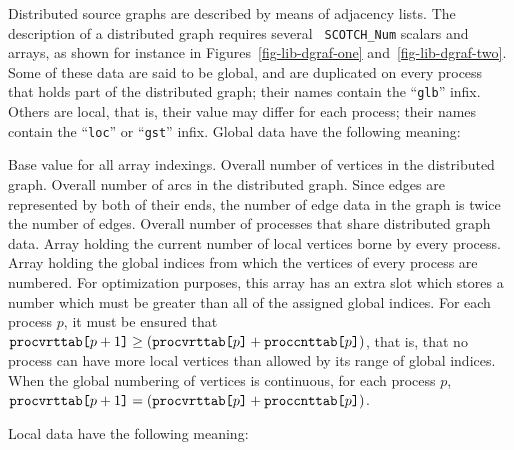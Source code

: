 Distributed source graphs are described by means of adjacency
lists. The description of a distributed graph requires several {\tt
SCOTCH\_Num} scalars and arrays, as shown for instance in
Figures~\ref{fig-lib-dgraf-one} and~\ref{fig-lib-dgraf-two}.
Some of these data are said to be global, and are duplicated on every
process that holds part of the distributed graph; their names contain
the ``{\tt glb}'' infix. Others are local, that is, their value may
differ for each process; their names contain the ``{\tt loc}'' or
``{\tt gst}'' infix. Global data have the following meaning:
\begin{itemize}
\iteme[{\tt baseval}]
Base value for all array indexings.
\iteme[{\tt vertglbnbr}]
Overall number of vertices in the distributed graph.
\iteme[{\tt edgeglbnbr}]
Overall number of arcs in the distributed graph. Since edges are
represented by both of their ends, the number of edge data in
the graph is twice the number of edges.
\iteme[{\tt procglbnbr}]
Overall number of processes that share distributed graph data.
\iteme[{\tt proccnttab}]
Array holding the current number of local vertices borne by every process.
\iteme[{\tt procvrttab}]
Array holding the global indices from which the vertices of every
process are numbered. For optimization purposes, this array has an
extra slot which stores a number which must be greater than all of the
assigned global indices. For each process $p$, it must be ensured that
$\mbox{\tt proc\lbt vrt\lbt tab[}p + 1\mbox{\tt]} \geq
(\mbox{\tt proc\lbt vrt\lbt tab[}p\mbox{\tt]} +
\mbox{\tt proc\lbt cnt\lbt tab[}p\mbox{\tt]})$, that is, that no process
can have more local vertices than allowed by its range of global indices.
When the global numbering of vertices is continuous, for each process $p$,
$\mbox{\tt proc\lbt vrt\lbt tab[}p + 1\mbox{\tt]} =
(\mbox{\tt proc\lbt vrt\lbt tab[}p\mbox{\tt]} +
\mbox{\tt proc\lbt cnt\lbt tab[}p\mbox{\tt]})$.
\end{itemize}
Local data have the following meaning:
